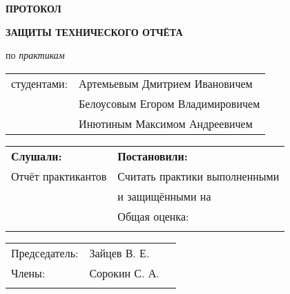 \begin{center}
\bfseries{\large ПРОТОКОЛ }

\vspace{12pt}

\bfseries{ЗАЩИТЫ ТЕХНИЧЕСКОГО ОТЧЁТА}
\end{center}
\noindent
по {\itshape практикам}

\vspace{8pt}
\noindent\begin{tabular}{@{}l l}
студентами: & Артемьевым Дмитрием Ивановичем \\
& Белоусовым Егором Владимировичем \\
& Инютиным Максимом Андреевичем \\
\end{tabular}

\begin{longtable}{p{7cm}|p{11cm}}
    \hline
    {\bfseries Слушали:} & {\bfseries Постановили:}  \\
    Отчёт практикантов & Считать практики выполненными \\
    & и защищёнными на \\
    \rule{0pt}{400pt} & Общая оценка: \underline{\hspace{2in}}\\
    \rule{0pt}{15pt} & \\
    \hline
\end{longtable}

\vfill

\noindent\begin{tabular}{@{}l l l}
Председатель: & Зайцев В. Е. & \underline{\hspace{2in}} \\
Члены: & Сорокин С. А. & \underline{\hspace{2in}} \\
& & \underline{\hspace{2in}}
\end{tabular}
\vspace{12pt}

\pagebreak

